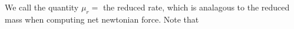 We call the quantity \(\mu_r = \) the reduced rate, which is analagous to the reduced mass when computing net newtonian force.  Note that